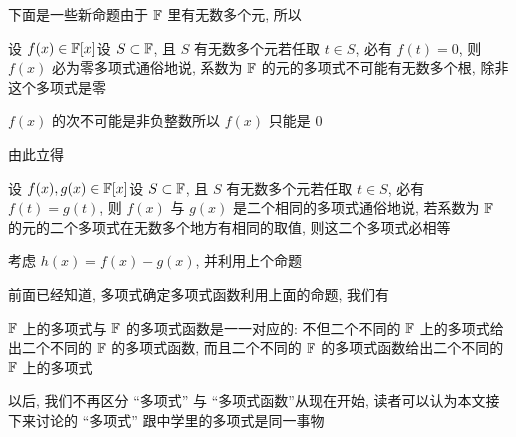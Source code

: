 下面是一些新命题\period 由于 $\mathbb{F}$ 里有无数多个元, 所以

\begin{proposition}
    设 $f(x) \in \mathbb{F}[x]$\period 设 $S \subset \mathbb{F}$, 且 $S$ 有无数多个元\period 若任取 $t \in S$, 必有 $f(t) = 0$, 则 $f(x)$ 必为零多项式\period 通俗地说, 系数为 $\mathbb{F}$ 的元的多项式不可能有无数多个根, 除非这个多项式是零\period
\end{proposition}

\begin{pf}
    $f(x)$ 的次不可能是非负整数\period 所以 $f(x)$ 只能是 $0$\period
\end{pf}

由此立得

\begin{proposition}
    设 $f(x),g(x) \in \mathbb{F}[x]$\period 设 $S \subset \mathbb{F}$, 且 $S$ 有无数多个元\period 若任取 $t \in S$, 必有 $f(t) = g(t)$, 则 $f(x)$ 与 $g(x)$ 是二个相同的多项式\period 通俗地说, 若系数为 $\mathbb{F}$ 的元的二个多项式在无数多个地方有相同的取值, 则这二个多项式必相等\period
\end{proposition}

\begin{pf}
    考虑 $h(x) = f(x) - g(x)$, 并利用上个命题\period
\end{pf}

前面已经知道, 多项式确定多项式函数\period 利用上面的命题, 我们有

\begin{proposition}
    $\mathbb{F}$ 上的多项式与 $\mathbb{F}$ 的多项式函数是一一对应的: 不但二个不同的 $\mathbb{F}$ 上的多项式给出二个不同的 $\mathbb{F}$ 的多项式函数, 而且二个不同的 $\mathbb{F}$ 的多项式函数给出二个不同的 $\mathbb{F}$ 上的多项式\period
\end{proposition}

\begin{remark}
    以后, 我们不再区分 ``多项式'' 与 ``多项式函数''\period 从现在开始, 读者可以认为本文接下来讨论的 ``多项式'' 跟中学里的多项式是同一事物\period
\end{remark}
